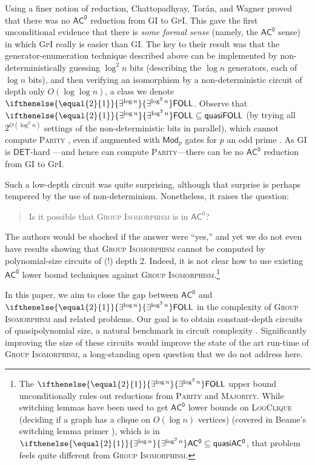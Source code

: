 \documentclass{theoretics}
\newcommand{\algprobm}[1]{\textsc{#1}\xspace}
\newcommand{\betacc}[1]{\ifthenelse{\equal{#1}{1}}{\exists^{\log n}}{\exists^{\log^{#1}n}}} %
\newcommand*{\ComplexityClass}[1]{\ensuremath{\mathsf{#1}}\xspace}
\newcommand{\ACz}{\ComplexityClass{AC^0}}
\newcommand{\qACz}{\ComplexityClass{quasiAC^0}}
\newcommand{\FOLL}{\ComplexityClass{FOLL}}
\begin{document}
Using a finer notion of reduction, Chattopadhyay, Torán, and Wagner \cite{ChattopadhyayToranWagner} proved that there was no $\ACz$ reduction from \algprobm{GI} to \algprobm{GpI}. This gave the first unconditional evidence that there is \emph{some formal sense} (namely, the $\ACz$ sense) in which \algprobm{GpI} really is easier than \algprobm{GI}. The key to their result was that the generator-enumeration technique described above can be implemented by non-deterministically guessing $\log^2 n$ bits (describing the $\log n$ generators, each of $\log n$ bits), and then verifying an isomorphism by a non-deterministic circuit of depth only $O(\log \log n)$, 
a class we denote $\betacc{2}\FOLL$. Observe that $\betacc{2}\FOLL \subseteq \mathsf{quasiFOLL}$ (by trying all $2^{O(\log^2 n)}$ settings of the non-deterministic bits in parallel), which cannot compute \algprobm{Parity} \cite{Hastad}, even if augmented with $\mathsf{Mod}_p$ gates for $p$ an odd prime \cite{Razborov, Smolensky87algebraicmethods, ChattopadhyayToranWagner}.  As \algprobm{GI} is $\mathsf{DET}$-hard \cite{Toran}---and hence can compute \algprobm{Parity}---there can be no $\ACz$ reduction from \algprobm{GI} to \algprobm{GpI}.

Such a low-depth circuit was quite surprising, although that surprise is perhaps tempered by the use of non-determinism. Nonetheless, it raises the question: 

\begin{quotation}
\noindent Is it possible that \algprobm{Group Isomorphism} is in $\mathsf{AC}^0$?
\end{quotation}

\noindent The authors would be shocked if the answer were ``yes,'' and yet we do not even have results showing that \algprobm{Group Isomorphism} cannot be computed by polynomial-size circuits of (!) depth 2. Indeed, it is not clear how to use existing $\ACz$ lower bound techniques against \algprobm{Group Isomorphism}.\footnote{The $\betacc{2}\FOLL$ upper bound unconditionally rules out reductions from \algprobm{Parity} and \algprobm{Majority}. While switching lemmas have been used to get $\ACz$ lower bounds on \algprobm{LogClique} (deciding if a graph has a clique on $O(\log n)$ vertices) \cite{lynch, Beame1990, RossmanClique} (covered in Beame's switching lemma primer \cite{BeamePrimer}), which is in $\betacc{2}\ACz \subseteq \qACz$, that problem feels quite different from \algprobm{Group Isomorphism}.}

In this paper, we aim to close the gap between $\ACz$ and $\betacc{2}\FOLL$ in the complexity of \algprobm{Group Isomorphism} and related problems. 
Our goal is to obtain constant-depth circuits of quasipolynomial size, a natural benchmark in circuit complexity \cite{BarringtonQuasipolynomial}. Significantly improving the size of these circuits would improve the state of the art run-time of \algprobm{Group Isomorphism}, a long-standing open question that we do not address here.
\end{document}
